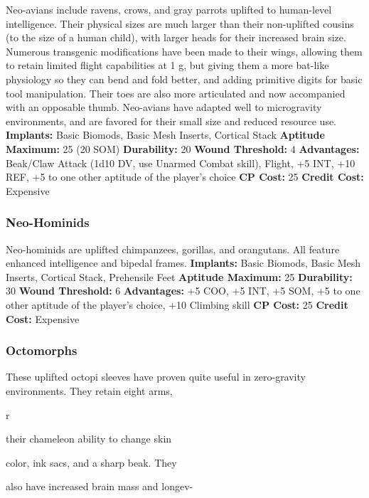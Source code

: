 Neo-avians include ravens, crows, and gray parrots 
uplifted to human-level intelligence. Their physical 
sizes are much larger than their non-uplifted cousins
(to the size of a human child), with larger heads
for their increased brain size. Numerous transgenic 
modifications have been made to their wings, allowing
them to retain limited flight capabilities at 1 g,
but giving them a more bat-like physiology so they 
can bend and fold better, and adding primitive digits 
for basic tool manipulation. Their toes are also more 
articulated and now accompanied with an opposable 
thumb. Neo-avians have adapted well to microgravity 
environments, and are favored for their small size and 
reduced resource use.
\textbf{Implants: }Basic Biomods, Basic Mesh Inserts, 
Cortical Stack
\textbf{Aptitude Maximum: }25 (20 SOM)
\textbf{Durability:} 20
\textbf{Wound Threshold:} 4
\textbf{Advantages: }Beak/Claw Attack (1d10 DV, use Unarmed
Combat skill), Flight, +5 INT, +10 REF, +5
to one other aptitude of the player's choice
\textbf{CP Cost:} 25
\textbf{Credit Cost: }Expensive

\subsubsection{Neo-Hominids}

Neo-hominids are uplifted chimpanzees, gorillas, and 
orangutans. All feature enhanced intelligence and 
bipedal frames.
\textbf{Implants: }Basic Biomods, Basic Mesh Inserts, 
Cortical Stack, Prehensile Feet
\textbf{Aptitude Maximum:} 25
\textbf{Durability:} 30
\textbf{Wound Threshold:} 6
\textbf{Advantages:} +5 COO, +5 INT, +5 SOM, +5 to one other 
aptitude of the player's choice, +10 Climbing skill
\textbf{CP Cost:} 25
\textbf{Credit Cost: }Expensive

\subsubsection{Octomorphs}

These uplifted octopi sleeves have proven quite useful 
in zero-gravity environments. They retain eight arms, 

r

their chameleon ability to change skin 

color, ink sacs, and a sharp beak. They 

also have increased brain mass and longev-


